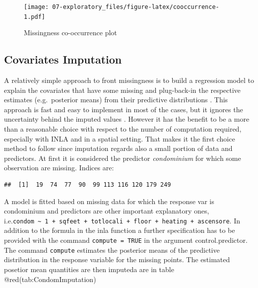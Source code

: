 \documentclass[
  12pt,
  a4paper,
  oneside]{book}
\theoremstyle{definition}
\theoremstyle{definition}
\theoremstyle{definition}
\theoremstyle{remark}
\begin{document}
\begin{figure}
\centering
\texttt{[image: 07-exploratory\_files/figure-latex/cooccurrence-1.pdf]}
\caption{\label{fig:cooccurrence}Missingness co-occurrence plot}
\end{figure}

\hypertarget{covariates-imputation}{%
\subsection{Covariates Imputation}\label{covariates-imputation}}

A relatively simple approach to front missingness is to build a regression model to explain the covariates that have some missing and plug-back-in the respective estimates (e.g.~posterior means) from their predictive distributions \citet{Little}. This approach is fast and easy to implement in most of the cases, but it ignores the uncertainty behind the imputed values \citep{Bayesian_INLA_Rubio}. However it has the benefit to be a more than a reasonable choice with respect to the number of computation required, especially with INLA and in a spatial setting. That makes it the first choice method to follow since imputation regards also a small portion of data and predictors. At first it is considered the predictor \emph{condominium} for which some observation are missing. Indices are:

\begin{verbatim}
##  [1]  19  74  77  90  99 113 116 120 179 249
\end{verbatim}

A model is fitted based on missing data for which the response var is condominium and predictors are other important explanatory ones, i.e.\texttt{condom\ \textasciitilde{}\ 1\ +\ sqfeet\ +\ totlocali\ +\ floor\ +\ heating\ +\ ascensore}. In addition to the formula in the inla function a further specification has to be provided with the command \texttt{compute\ =\ TRUE} in the argument control.predictor. The command \texttt{compute} estimates the posterior means of the predictive distribution in the response variable for the missing points. The estimated posetior mean quantities are then imputeda are in table @red(tab:CondomImputation)
\end{document}
